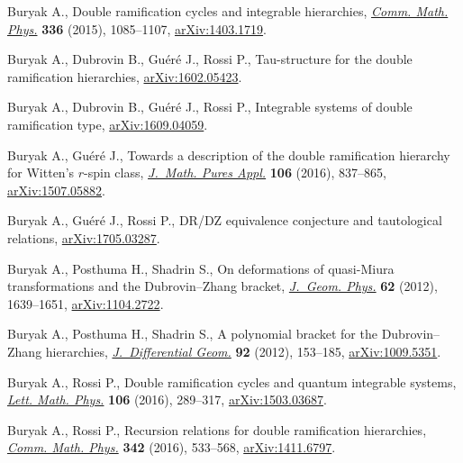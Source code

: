 \documentclass[pdftex]{sigma}
\numberwithin{equation}{section}
\newcommand{\<}{\left<}
\renewcommand{\>}{\right>}
\begin{document}
\begin{thebibliography}{99}
\footnotesize\itemsep=0pt

Buryak A., Double ramif\/ication cycles and integrable hierarchies, \href{https://doi.org/10.1007/s00220-014-2235-2}{\textit{Comm.
 Math. Phys.}} \textbf{336} (2015), 1085--1107, \href{https://arxiv.org/abs/1403.1719}{arXiv:1403.1719}.

Buryak A., Dubrovin B., Gu\'er\'e J., Rossi P., Tau-structure for the double
 ramif\/ication hierarchies, \href{https://arxiv.org/abs/1602.05423}{arXiv:1602.05423}.

Buryak A., Dubrovin B., Gu\'er\'e J., Rossi P., Integrable systems of double
 ramif\/ication type, \href{https://arxiv.org/abs/1609.04059}{arXiv:1609.04059}.

Buryak A., Gu\'er\'e J., Towards a description of the double ramif\/ication
 hierarchy for {W}itten's {$r$}-spin class, \href{https://doi.org/10.1016/j.matpur.2016.03.013}{\textit{J.~Math. Pures Appl.}}
 \textbf{106} (2016), 837--865, \href{https://arxiv.org/abs/1507.05882}{arXiv:1507.05882}.

Buryak A., Gu\'er\'e J., Rossi P., DR/DZ equivalence conjecture and
 tautological relations, \href{https://arxiv.org/abs/1705.03287}{arXiv:1705.03287}.

Buryak A., Posthuma H., Shadrin S., On deformations of quasi-{M}iura
 transformations and the {D}ubrovin--{Z}hang bracket, \href{https://doi.org/10.1016/j.geomphys.2012.03.006}{\textit{J.~Geom. Phys.}}
 \textbf{62} (2012), 1639--1651, \href{https://arxiv.org/abs/1104.2722}{arXiv:1104.2722}.

Buryak A., Posthuma H., Shadrin S., A polynomial bracket for the
 {D}ubrovin--{Z}hang hierarchies, \href{https://doi.org/10.4310/jdg/1352211225}{\textit{J.~Diffe\-ren\-tial Geom.}} \textbf{92}
 (2012), 153--185, \href{https://arxiv.org/abs/1009.5351}{arXiv:1009.5351}.

Buryak A., Rossi P., Double ramif\/ication cycles and quantum integrable systems,
 \href{https://doi.org/10.1007/s11005-015-0814-6}{\textit{Lett. Math. Phys.}} \textbf{106} (2016), 289--317,
 \href{https://arxiv.org/abs/1503.03687}{arXiv:1503.03687}.

Buryak A., Rossi P., Recursion relations for double ramif\/ication hierarchies,
 \href{https://doi.org/10.1007/s00220-015-2535-1}{\textit{Comm. Math. Phys.}} \textbf{342} (2016), 533--568, \href{https://arxiv.org/abs/1411.6797}{arXiv:1411.6797}.


\end{thebibliography}
\end{document}
